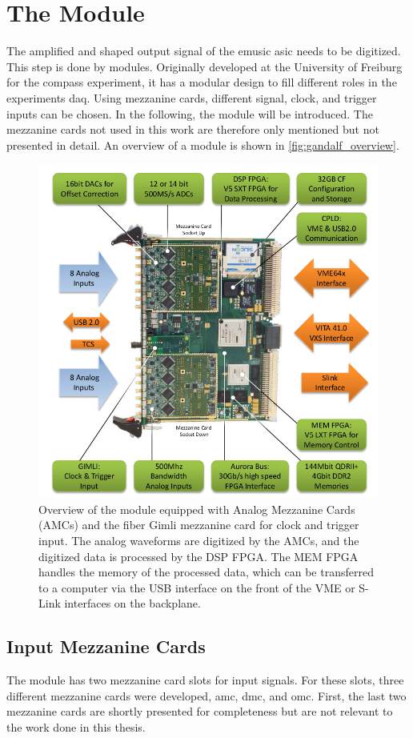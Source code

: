 \section{The  Module}
The amplified and shaped output signal of the \ac{emusic} \ac{asic} needs to be digitized.
This step is done by  modules.
Originally developed at the University of Freiburg for the \ac{compass} experiment, it has a modular design to fill different roles in the experiments \ac{daq}.
Using mezzanine cards, different signal, clock, and trigger inputs can be chosen.
In the following, the  module will be introduced.
The mezzanine cards not used in this work are therefore only mentioned but not presented in detail.
An overview of a  module is shown in \autoref{fig:gandalf_overview}.
\begin{figure}
	\centering
	\includegraphics[width=.8\textwidth]{pictures/gandalf_overview.png}
	\caption[Overview of the GANDALF module]{Overview of the  module equipped with Analog Mezzanine Cards (AMCs) and the fiber Gimli mezzanine card for clock and trigger input. The analog waveforms are digitized by the AMCs, and the digitized data is processed by the DSP FPGA. The MEM FPGA handles the memory of the processed data, which can be transferred to a computer via the USB interface on the front of the VME or S-Link interfaces on the backplane. \cite{herrmann}}
	\label{fig:gandalf_overview}
\end{figure}

\subsection{Input Mezzanine Cards}
The  module has two mezzanine card slots for input signals.
For these slots, three different mezzanine cards were developed, \ac{amc}, \ac{dmc}, and \ac{omc}.
First, the last two mezzanine cards are shortly presented for completeness but are not relevant to the work done in this thesis.

